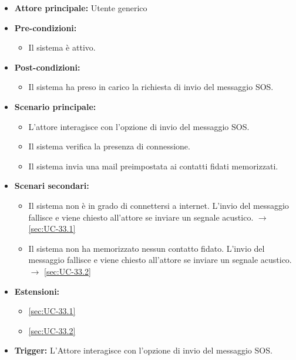 \documentclass[a4paper,12pt]{article}
\begin{document}
\begin{itemize}
    \item \textbf{Attore principale:} Utente generico
    \item \textbf{Pre-condizioni:} 
    \begin{itemize}
        \item Il sistema è attivo.
    \end{itemize}
    \item \textbf{Post-condizioni:}
    \begin{itemize}
        \item Il sistema ha preso in carico la richiesta di invio del messaggio SOS.
    \end{itemize}
    \item \textbf{Scenario principale:} 
    \begin{itemize}
        \item L’attore interagisce con l'opzione di invio del messaggio SOS.
        \item Il sistema verifica la presenza di connessione.
	    \item Il sistema invia una mail preimpostata ai contatti fidati memorizzati.
    \end{itemize}
    \item \textbf{Scenari secondari:} 
    \begin{itemize}
        \item Il sistema non è in grado di connettersi a internet. L'invio del messaggio fallisce e viene chiesto all'attore se inviare un segnale acustico. $\rightarrow$ \ref{sec:UC-33.1}
        \item Il sistema non ha memorizzato nessun contatto fidato. L'invio del messaggio fallisce e viene chiesto all'attore se inviare un segnale acustico. $\rightarrow$ \ref{sec:UC-33.2}
    \end{itemize}
    \item \textbf{Estensioni:}
    \begin{itemize}
        \item \ref{sec:UC-33.1}
        \item \ref{sec:UC-33.2}
    \end{itemize}
    \item \textbf{Trigger:} L'Attore interagisce con l'opzione di invio del messaggio SOS.
\end{itemize}
\end{document}
